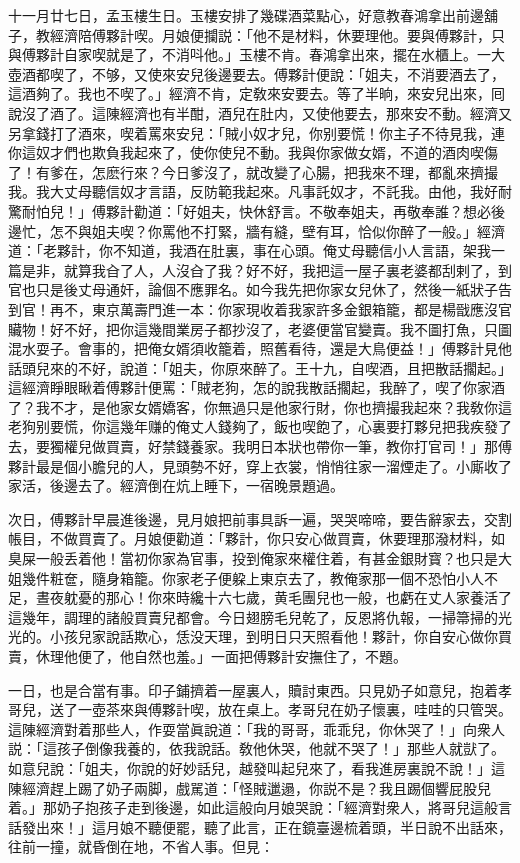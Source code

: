 十一月廿七日，孟玉樓生日。玉樓安排了幾碟酒菜點心，好意教春鴻拿出前邊舖子，教經濟陪傅夥計喫。月娘便攔説：「他不是材料，休要理他。要與傅夥計，只與傅夥計自家喫就是了，不消呌他。」玉樓不肯。春鴻拿出來，擺在水櫃上。一大壺酒都喫了，不够，又使來安兒後邊要去。傅夥計便說：「姐夫，不消要酒去了，這酒夠了。我也不喫了。」經濟不肯，定敎來安要去。等了半晌，來安兒出來，囘說沒了酒了。這陳經濟也有半酣，酒兒在肚内，又使他要去，那來安不動。經濟又另拿錢打了酒來，喫着罵來安兒：「賊小奴才兒，你别要慌！你主子不待見我，連你這奴才們也欺負我起來了，使你使兒不動。我與你家做女婿，不道的酒肉喫傷了！有爹在，怎麽行來？今日爹沒了，就改變了心腸，把我來不理，都亂來擠撮我。我大丈母聽信奴才言語，反防範我起來。凡事託奴才，不託我。由他，我好耐驚耐怕兒！」傅夥計勸道：「好姐夫，快休舒言。不敬奉姐夫，再敬奉誰？想必後邊忙，怎不與姐夫喫？你罵他不打緊，牆有縫，壁有耳，恰似你醉了一般。」經濟道：「老夥計，你不知道，我酒在肚裏，事在心頭。俺丈母聽信小人言語，架我一篇是非，就算我㒲了人，人沒㒲了我？好不好，我把這一屋子裏老婆都刮剌了，到官也只是後丈母通奸，論個不應罪名。如今我先把你家女兒休了，然後一紙狀子告到官！再不，東京萬壽門進一本：你家現收着我家許多金銀箱籠，都是楊戩應沒官贜物！好不好，把你這幾間業房子都抄沒了，老婆便當官變賣。我不圖打魚，只圖混水耍子。會事的，把俺女婿須收籠着，照舊看待，還是大鳥便益！」傅夥計見他話頭兒來的不好，說道：「姐夫，你原來醉了。王十九，自喫酒，且把散話擱起。」這經濟睜眼瞅着傅夥計便罵：「賊老狗，怎的說我散話擱起，我醉了，喫了你家酒了？我不才，是他家女婿嬌客，你無過只是他家行財，你也擠撮我起來？我敎你這老狗别要慌，你這幾年赚的俺丈人錢夠了，飯也喫飽了，心裏要打夥兒把我疾發了去，要獨權兒做買賣，好禁錢養家。我明日本狀也帶你一筆，教你打官司！」那傅夥計最是個小膽兒的人，見頭勢不好，穿上衣裳，悄悄往家一溜煙走了。小廝收了家活，後邊去了。經濟倒在炕上睡下，一宿晚景題過。

次日，傅夥計早晨進後邊，見月娘把前事具訴一遍，哭哭啼啼，要告辭家去，交割帳目，不做買賣了。月娘便勸道：「夥計，你只安心做買賣，休要理那潑材料，如臭屎一般丢着他！當初你家為官事，投到俺家來權住着，有甚金銀財寳？也只是大姐幾件粧奩，隨身箱籠。你家老子便躱上東京去了，教俺家那一個不恐怕小人不足，晝夜躭憂的那心！你來時纔十六七歲，黄毛團兒也一般，也虧在丈人家養活了這幾年，調理的諸般買賣兒都會。今日翅膀毛兒乾了，反恩將仇報，一掃箒掃的光光的。小孩兒家說話欺心，恁没天理，到明日只天照看他！夥計，你自安心做你買賣，休理他便了，他自然也羞。」一面把傅夥計安撫住了，不題。

一日，也是合當有事。印子鋪擠着一屋裏人，贖討東西。只見奶子如意兒，抱着孝哥兒，送了一壺茶來與傅夥計喫，放在桌上。孝哥兒在奶子懷裏，哇哇的只管哭。這陳經濟對着那些人，作耍當眞說道：「我的哥哥，乖乖兒，你休哭了！」向衆人説：「這孩子倒像我養的，依我說話。敎他休哭，他就不哭了！」那些人就獃了。如意兒說：「姐夫，你說的好妙話兒，越發叫起兒來了，看我進房裏說不說！」這陳經濟趕上踢了奶子兩脚，戲駡道：「怪賊邋遢，你説不是？我且踢個響屁股兒着。」那奶子抱孩子走到後邊，如此這般向月娘哭說：「經濟對衆人，將哥兒這般言話發出來！」這月娘不聽便罷，聽了此言，正在鏡臺邊梳着頭，半日說不出話來，往前一撞，就昏倒在地，不省人事。但見：

